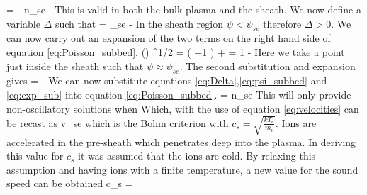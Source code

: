 \be 
{} = - n_{se} \left[ \left(\frac{\psi_{se}}{\psi}\right)^{1/2} - \exp\left[\frac{e(\psi -\psi_{se})}{kT_e}\right] \right]
\label{eq:Poisson_subbed}
\ee
This is valid in both the bulk plasma and the sheath. We now define a variable $\Delta$ such that
\be 
\Delta = \psi_{se} - \psi
\label{eq:Delta}
\ee
In the sheath region $\psi < \psi_{se}$ therefore $\Delta >0$. We can now carry out an expansion of the two terms on the right hand side of equation \ref{eq:Poisson_subbed}.
\be 
\left(\right) ^{1/2}  = \left(\frac{\Delta}{\psi} +1 \right)  + \frac{\Delta}{2\psi} = 1 - 
\label{eq:psi_subbed}
\ee
Here we take a point just inside the sheath such that $\psi \approx \psi_{se}$. 
The second substitution and expansion gives 
\be
\exp{} =  \exp{}  - 
\label{eq:exp_sub}
\ee
We can now substitute equations \ref{eq:Delta},\ref{eq:psi_subbed} and \ref{eq:exp_sub} into equation \ref{eq:Poisson_subbed}. 
\be
{}  =  n_{se} 
\ee
This will only provide non-oscillatory solutions when 
\be 
{} \geq {}
\ee 
Which, with the use of equation \ref{eq:velocities} can be recast as 
\be 
v_{se} \geq {}
\ee
which is the Bohm criterion with $c_s = \sqrt{\frac{k T_e}{m_i}}$. 
Ions are accelerated in the pre-sheath which penetrates deep into the plasma. In deriving this value for $c_s$ it was assumed that the ions are cold. By relaxing this assumption and having ions with a finite temperature, a new value for the sound speed can be obtained \cite{stangeby-2000} 
\be
c_s = 
\ee

